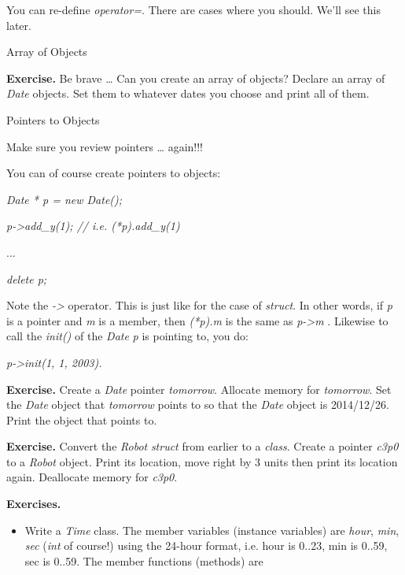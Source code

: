 \documentclass[
]{article}
\providecommand{\tightlist}{%
  \setlength{\itemsep}{0pt}\setlength{\parskip}{0pt}}
\begin{document}
You can re-define \emph{operator=}. There are cases where you should.
We'll see this later.

Array of Objects

\textbf{Exercise.} Be brave \ldots{} Can you create an array of objects?
Declare an array of \emph{Date} objects. Set them to whatever dates you
choose and print all of them.

Pointers to Objects

Make sure you review pointers \ldots{} again!!!

You can of course create pointers to objects:

\emph{Date * p = new Date();}

\emph{p-\textgreater add\_y(1); // i.e. (*p).add\_y(1)}

...

\emph{delete p;}

Note the \emph{-\textgreater{}} operator. This is just like for the case
of \emph{struct}. In other words, if \emph{p} is a pointer and \emph{m}
is a member, then \emph{(*p).m} is the same as \emph{p-\textgreater m} .
Likewise to call the \emph{init()} of the \emph{Date} \emph{p} is
pointing to, you do:

\emph{p-\textgreater init(1, 1, 2003).}

\textbf{Exercise.} Create a \emph{Date} pointer \emph{tomorrow}.
Allocate memory for \emph{tomorrow}. Set the \emph{Date} object that
\emph{tomorrow} points to so that the \emph{Date} object is 2014/12/26.
Print the object that points to.

\textbf{Exercise.} Convert the \emph{Robot} \emph{struct} from earlier
to a \emph{class}. Create a pointer \emph{c3p0} to a \emph{Robot}
object. Print its location, move right by 3 units then print its
location again. Deallocate memory for \emph{c3p0}.

\textbf{Exercises.}

\begin{itemize}
\tightlist
\item
  Write a \emph{Time} class. The member variables (instance variables)
  are \emph{hour}, \emph{min}, \emph{sec} (\emph{int} of course!) using
  the 24-hour format, i.e. hour is 0..23, min is 0..59, sec is 0..59.
  The member functions (methods) are
\end{itemize}
\end{document}
